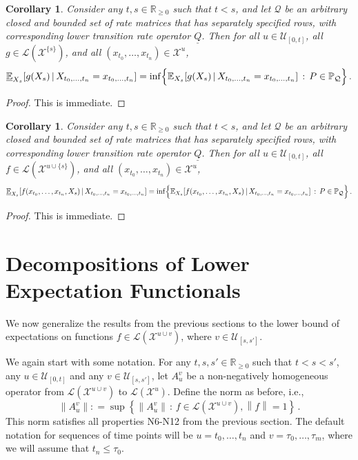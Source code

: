 \documentclass[10pt]{paper}
\newtheorem{corollary}[theorem]{Corollary}
\newcommand{\reals}{\mathbb{R}}
\newcommand{\realsnonneg}{\reals_{\geq 0}}
\newcommand{\states}{\mathcal{X}}
\newcommand{\processes}{\mathbb{P}}
\newcommand{\gambles}{\mathcal{L}}
\newcommand{\rateset}{\mathcal{Q}}
\newcommand{\lrate}{\underline{Q}}
\newcommand{\norm}[1]{\left\lVert #1 \right\rVert}
\newcommand{\coloneqq}{:\!=}
\begin{document}
\begin{corollary}
Consider any $t,s\in\realsnonneg$ such that $t<s$, and let $\rateset$ be an arbitrary closed and bounded set of rate matrices that has separately specified rows, with corresponding lower transition rate operator $\lrate$. Then for all $u\in\mathcal{U}_{[0,t]}$, all $g\in\gambles(\states^{\{s\}})$, and all $(x_{t_0},\ldots,x_{t_n})\in\states^u$,
\begin{equation*}
\underline{\mathbb{E}}_{X_s}[g(X_s)\,\vert\,X_{t_0,\ldots,t_n}=x_{t_0,\ldots,t_n}] = \inf\Bigl\{ \mathbb{E}_{X_s}[g(X_s)\,\vert\,X_{t_0,\ldots,t_n}=x_{t_0,\ldots,t_n}]\,:\, P\in\processes_\rateset \Bigr\}\,.
\end{equation*}
\end{corollary}
\begin{proof}
This is immediate.
\end{proof}

\begin{corollary}
Consider any $t,s\in\realsnonneg$ such that $t<s$, and let $\rateset$ be an arbitrary closed and bounded set of rate matrices that has separately specified rows, with corresponding lower transition rate operator $\lrate$. Then for all $u\in\mathcal{U}_{[0,t]}$, all $f\in\gambles(\states^{u\cup\{s\}})$, and all $(x_{t_0},\ldots,x_{t_n})\in\states^u$,
\begin{equation*}
\underline{\mathbb{E}}_{X_s}[f(x_{t_0},\ldots,x_{t_n},X_s)\,\vert\,X_{t_0,\ldots,t_n}=x_{t_0,\ldots,t_n}] = \inf\Bigl\{ \mathbb{E}_{X_s}[f(x_{t_0},\ldots,x_{t_n},X_s)\,\vert\,X_{t_0,\ldots,t_n}=x_{t_0,\ldots,t_n}]\,:\, P\in\processes_\rateset \Bigr\}\,.
\end{equation*}
\end{corollary}
\begin{proof}
This is immediate.
\end{proof}


\section{Decompositions of Lower Expectation Functionals}\label{sec:decomp}

We now generalize the results from the previous sections to the lower bound of expectations on functions $f\in\gambles(\states^{u\cup v})$, where $v\in\mathcal{U}_{[s,s']}$.

We again start with some notation. For any $t,s,s'\in\realsnonneg$ such that $t<s<s'$, any $u\in\mathcal{U}_{[0,t]}$ and any $v\in\mathcal{U}_{[s,s']}$, let $A_u^v$ be a non-negatively homogeneous operator from $\gambles(\states^{u\cup v})$ to $\gambles(\states^u)$. Define the norm as before, i.e.,
\begin{equation*}
\norm{A_u^v} \coloneqq \sup\left\{\norm{A_u^v}\,:\,f\in\gambles(\states^{u\cup v}), \norm{f}=1\right\}\,.
\end{equation*}
This norm satisfies all properties N6-N12 from the previous section. The default notation for sequences of time points will be $u=t_0,\ldots,t_n$ and $v=\tau_0,\ldots,\tau_m$, where we will assume that $t_n\leq \tau_0$.
\end{document}
